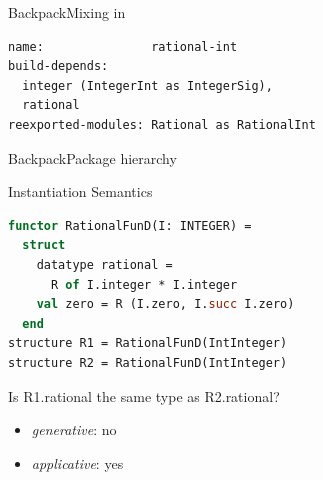 \documentclass{beamer}
\begin{document}
\begin{frame}[fragile]{Backpack}{Mixing in}
\begin{lstlisting}[language=Cabal,title=Rationals based on Integers]
name:               rational-int
build-depends:
  integer (IntegerInt as IntegerSig),
  rational
reexported-modules: Rational as RationalInt
\end{lstlisting}
\end{frame}

\begin{frame}{Backpack}{Package hierarchy}
\end{frame}

\begin{frame}[fragile]{Instantiation Semantics}
\begin{lstlisting}[language=ML]
functor RationalFunD(I: INTEGER) =
  struct
    datatype rational =
      R of I.integer * I.integer
    val zero = R (I.zero, I.succ I.zero)
  end
structure R1 = RationalFunD(IntInteger)
structure R2 = RationalFunD(IntInteger)
\end{lstlisting}
Is R1.rational the same type as R2.rational?
\begin{itemize}
\item \textit{generative}: no
\item \textit{applicative}: yes
\end{itemize}
\end{frame}
\end{document}

